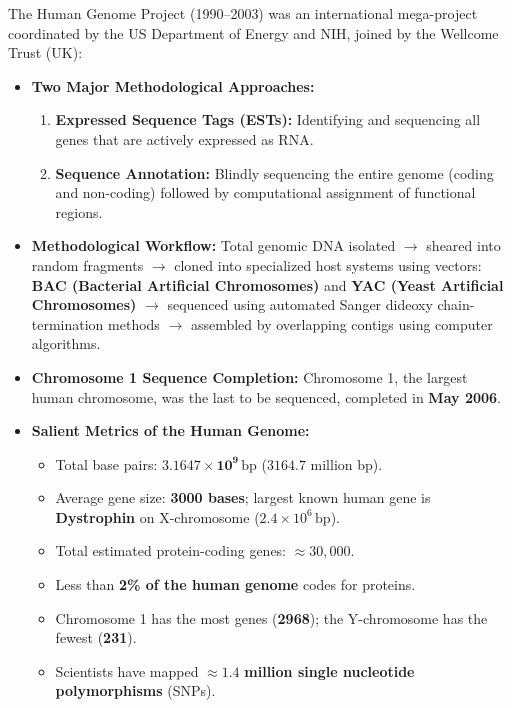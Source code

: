 \documentclass[10pt,twoside,openright]{book}
\begin{document}
\begin{ncertbox}
The Human Genome Project (1990--2003) was an international mega-project coordinated by the US Department of Energy and NIH, joined by the Wellcome Trust (UK):
\begin{itemize}[leftmargin=*]
  \item \textbf{Two Major Methodological Approaches:}
  \begin{enumerate}
    \item \textbf{Expressed Sequence Tags (ESTs):} Identifying and sequencing all genes that are actively expressed as RNA.
    \item \textbf{Sequence Annotation:} Blindly sequencing the entire genome (coding and non-coding) followed by computational assignment of functional regions.
  \end{enumerate}
  \item \textbf{Methodological Workflow:} Total genomic DNA isolated $\to$ sheared into random fragments $\to$ cloned into specialized host systems using vectors: \textbf{BAC (Bacterial Artificial Chromosomes)} and \textbf{YAC (Yeast Artificial Chromosomes)} $\to$ sequenced using automated Sanger dideoxy chain-termination methods $\to$ assembled by overlapping contigs using computer algorithms.
  \item \textbf{Chromosome 1 Sequence Completion:} Chromosome 1, the largest human chromosome, was the last to be sequenced, completed in \textbf{May 2006}.
  \item \textbf{Salient Metrics of the Human Genome:}
  \begin{itemize}
    \item Total base pairs: $\mathbf{3.1647 \times 10^9\,\mathrm{bp}}$ ($3164.7$ million bp).
    \item Average gene size: \textbf{3000 bases}; largest known human gene is \textbf{Dystrophin} on X-chromosome ($2.4 \times 10^6\,\mathrm{bp}$).
    \item Total estimated protein-coding genes: \textbf{$\approx 30,000$}.
    \item Less than \textbf{2\% of the human genome} codes for proteins.
    \item Chromosome 1 has the most genes (\textbf{2968}); the Y-chromosome has the fewest (\textbf{231}).
    \item Scientists have mapped $\approx \mathbf{1.4}$ \textbf{million single nucleotide polymorphisms} (SNPs).
  \end{itemize}
\end{itemize}
\end{ncertbox}
\end{document}
